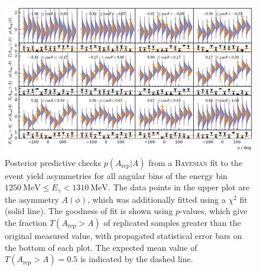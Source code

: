	\begin{figure}
		\centering
		\includegraphics[width=\linewidth]{../bayes/realdeal/plots/ppd_checks.pdf}
		\caption{Posterior predictive checks $p\left(A_\text{rep}\big|A\right)$ from a \textsc{Bayesian} fit to the event yield asymmetries for all angular bins of the energy bin $\SI{1250}{\mega\eV}\leq E_\gamma<\SI{1310}{\mega\eV}$. The data points in the upper plot are the asymmetry $A\left(\phi\right)$, which was additionally fitted using a $\chi^2$ fit (solid line). The goodness of fit is shown using $p$-values, which give the fraction $T\left(A_\text{rep}>A\right)$ of replicated samples greater than the original measured value, with propagated statistical error bars on the bottom of each plot. The expected mean value of $T\left(A_\text{rep}>A\right)=0.5$ is indicated by the dashed line. }
		\label{fig:asym}
	\end{figure}

\newpage


